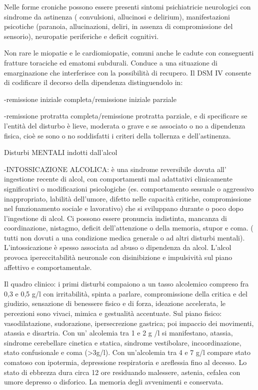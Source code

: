 \documentclass[]{article}
\begin{document}
Nelle forme croniche possono essere presenti sintomi psichiatricie
neurologici con sindrome da astinenza ( convulsioni, allucinosi e
delirium), manifestazioni psicotiche (paranoia, allucinazioni, deliri,
in assenza di compromissione del sensorio), neuropatie periferiche e
deficit cognitivi.

Non rare le miopatie e le cardiomiopatie, comuni anche le cadute con
conseguenti fratture toraciche ed ematomi subdurali. Conduce a una
situazione di emarginazione che interferisce con la possibilità di
recupero. Il DSM IV consente di codificare il decorso della dipendenza
distinguendolo in:

-remissione iniziale completa/remissione iniziale parziale

-remissione protratta completa/remissione protratta parziale, e di
specificare se l'entità del disturbo è lieve, moderata o grave e se
associato o no a dipendenza fisica, cioè se sono o no soddisfatti i
criteri della tollernza e dell'astinenza.

Disturbi MENTALI indotti dall'alcol

-INTOSSICAZIONE ALCOLICA: è una sindrome reversibile dovuta all'
ingestione recente di alcol, con comportamenti mal adattativi
clinicamente significativi o modificazioni psicologiche (es.
comportamento sessuale o aggressivo inappropriato, labilità dell'umore,
difetto nelle capacità critiche, compromissione nel funzionamento
sociale e lavorativo) che si sviluppano durante o poco dopo l'ingestione
di alcol. Ci possono essere pronuncia indistinta, mancanza di
coordinazione, nistagmo, deficit dell'attenzione o della memoria, stupor
e coma. ( tutti non dovuti a una condizione medica generale o ad altri
disturbi mentali). L'intossicazione è spesso associata ad abuso o
dipendenza da alcol. L'alcol provoca ipereccitabilità neuronale con
disinibizione e impulsività sul piano affettivo e comportamentale.

Il quadro clinico: i primi disturbi compaiono a un tasso alcolemico
compreso fra 0,3 e 0,5 g/l con irritabilità, spinta a parlare,
compromissione della critica e del giudizio, sensazione di benessere
fisico e di forza, ideazione accelerata, le percezioni sono vivaci,
mimica e gestualità accentuate. Sul piano fisico: vasodilatazione,
sudorazione, ipersecrezione gastrica; poi impaccio dei movimenti,
atassia e disartria. Con un' alcolemia tra 1 e 2 g /l si manifestano,
atassia, sindrome cerebellare cinetica e statica, sindrome vestibolare,
incoordinazione, stato confusionale e coma (\textgreater{}3g/l). Con
un'alcolemia tra 4 e 7 g/l compare stato comatoso con ipotermia,
depressione respiratoria e areflessia fino al decesso. Lo stato di
ebbrezza dura circa 12 ore residuando malessere, astenia, cefalea con
umore depresso o disforico. La memoria degli avvenimenti e conservata.
\end{document}
